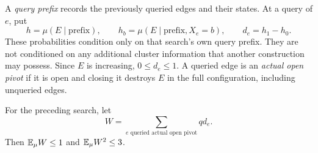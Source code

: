 A \emph{query prefix} records the previously queried edges and their
states. At a query of $e$, put
\[
 h=\mu(E\mid\text{prefix}),\qquad
 h_b=\mu(E\mid\text{prefix},X_e=b),\qquad d_e=h_1-h_0.
\]
These probabilities condition only on that search's own query prefix.
They are not conditioned on any additional cluster information that
another construction may possess. Since $E$ is increasing, $0\le d_e\le1$.
A queried edge is an \emph{actual open pivot} if it is open and closing
it destroys $E$ in the full configuration, including unqueried edges.

\begin{lemma}\label{lem:dfs}
For the preceding search, let
\[
 W=\sum_{e\text{ queried actual open pivot}}q d_e.
\]
Then $\mathbb E_\mu W\le1$ and $\mathbb E_\mu W^2\le3$.
\end{lemma}

